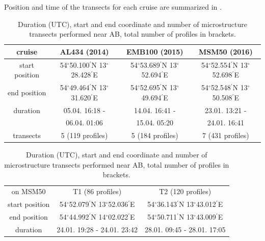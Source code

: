 Position and time of the transects for each cruise are summarized in 
.

 \begin{table}
\caption{Duration (UTC), start and end coordinate and number of microstructure 
transects performed near AB, total number of profiles in 
brackets.}\label{mss}
\begin{center}
\begin{tabular}{cccc}
cruise & AL434 (2014) & EMB100 (2015) & MSM50 (2016)\\
\hline
start position & 54$^\circ$50.100$^\prime$N 13$^\circ$28.428$^\prime$E & 
54$^\circ$53.689$^\prime$N 13$^\circ$52.694$^\prime$E & 
54$^\circ$52.554$^\prime$N 13$^\circ$52.698$^\prime$E\\
end position & 54$^\circ$49.464$^\prime$N 13$^\circ$31.620$^\prime$E & 
54$^\circ$52.695$^\prime$N 13$^\circ$49.694$^\prime$E & 
54$^\circ$52.548$^\prime$N 13$^\circ$50.508$^\prime$E\\
\hline
duration & 05.04. 16:18 - & 14.04. 16:41 -  & 23.01. 
13:21 -  \\
&  06.04. 01:06 & 15.04. 05:20 & 24.01. 16:41 \\
\hline
transects & 5 (119 profiles) & 5 (184 profiles) & 7 (431 profiles)\\
\end{tabular}
\end{center}
\vskip 0.5cm
\begin{tabular}{ccc}
 on MSM50 & T1 (86 profiles) & T2 (120 profiles) \\
 start position & 54$^\circ$52.079$^\prime$N 13$^\circ$52.036$^\prime$E & 
54$^\circ$36.143$^\prime$N 13$^\circ$43.012$^\prime$E\\
 end position & 54$^\circ$44.992$^\prime$N 14$^\circ$02.022$^\prime$E & 
54$^\circ$50.711$^\prime$N 13$^\circ$43.009$^\prime$E\\
 duration & 24.01. 19:28 - 24.01. 23:42 & 28.01. 09:45 - 28.01. 17:05 \\
\end{tabular}


\end{table}

